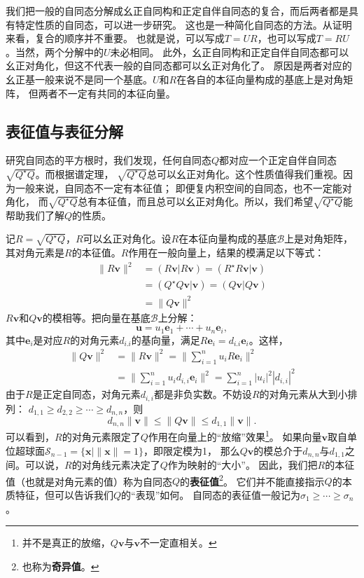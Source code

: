 \documentclass[12pt,UTF8,fontset=none]{ctexbook}
\begin{document}
我们把一般的自同态分解成幺正自同构和正定自伴自同态的复合，而后两者都是具有特定性质的自同态，可以进一步研究。
这也是一种简化自同态的方法。从证明来看，复合的顺序并不重要。
也就是说，可以写成$T = UR$，也可以写成$T = RU$。当然，两个分解中的$U$未必相同。
此外，幺正自同构和正定自伴自同态都可以幺正对角化，但这不代表一般的自同态都可以幺正对角化了。
原因是两者对应的幺正基一般来说不是同一个基底。$U$和$R$在各自的本征向量构成的基底上是对角矩阵，
但两者不一定有共同的本征向量。

\subsection{表征值与表征分解}
研究自同态的平方根时，我们发现，任何自同态$Q$都对应一个正定自伴自同态$\sqrt{Q^\star Q}$。而根据谱定理，
$\sqrt{Q^\star Q}$总可以幺正对角化。这个性质值得我们重视。因为一般来说，自同态不一定有本征值；
即便复内积空间的自同态，也不一定能对角化，
而$\sqrt{Q^\star Q}$总有本征值，而且总可以幺正对角化。所以，我们希望$\sqrt{Q^\star Q}$能帮助我们了解$Q$的性质。

记$R = \sqrt{Q^\star Q}$，$R$可以幺正对角化。设$R$在本征向量构成的基底$\mathcal{B}$上是对角矩阵，
其对角元素是$R$的本征值。$R$作用在一般向量上，结果的模满足以下等式：
\begin{align*}
    \| R\mathbf{v} \|^2 &= (R\mathbf{v} | R\mathbf{v}) = (R^\star R\mathbf{v} | \mathbf{v})  \\
    &= (Q^\star Q\mathbf{v} | \mathbf{v}) = (Q\mathbf{v} | Q\mathbf{v})  \\
    &= \| Q\mathbf{v} \|^2 
\end{align*}
$R\mathbf{v}$和$Q\mathbf{v}$的模相等。把向量在基底$\mathcal{B}$上分解：
$$ \mathbf{u} = u_1\mathbf{e}_1 + \cdots + u_n\mathbf{e}_i,$$
其中$\mathbf{e}_i$是对应$R$的对角元素$d_{i.i}$的基向量，满足$R\mathbf{e}_i = d_{i.i}\mathbf{e}_i$。这样，
\begin{align*}
    \| Q\mathbf{v} \|^2 &= \| R\mathbf{v} \|^2 = \| \sum_{i=1}^n u_i R\mathbf{e}_i \|^2   \\
    &= \| \sum_{i=1}^n u_i d_{i,i}\mathbf{e}_i \|^2 = \sum_{i=1}^n |u_i|^2 |d_{i,i}|^2  
\end{align*}
由于$R$是正定自同态，对角元素$d_{i,i}$都是非负实数。不妨设$R$的对角元素从大到小排列：
$d_{1,1} \geqslant d_{2,2} \geqslant \cdots \geqslant d_{n,n}$，则
$$ d_{n,n} \| \mathbf{v} \| \leqslant \| Q\mathbf{v} \| \leqslant d_{1,1} \| \mathbf{v} \|. $$
可以看到，$R$的对角元素限定了$Q$作用在向量上的“放缩”效果\footnote{并不是真正的放缩，$Q\mathbf{v}$与$\mathbf{v}$不一定直相关。}。
如果向量$\mathbf{v}$取自单位超球面$\mathcal{S}_{n-1} = \{\mathbf{x} | \| \mathbf{x} \| = 1 \}$，即限定模为1，
那么$Q\mathbf{v}$的模总介于$d_{n,n}$与$d_{1,1}$之间。可以说，$R$的对角线元素决定了$Q$作为映射的“大小”。
因此，我们把$R$的本征值（也就是对角元素的值）称为自同态$Q$的\textbf{表征值}\footnote{也称为\textbf{奇异值}。}。
它们并不能直接指示$Q$的本质特征，但可以告诉我们$Q$的“表现”如何。
自同态的表征值一般记为$\sigma_1 \geqslant \cdots \geqslant \sigma_n$。
\end{document}
